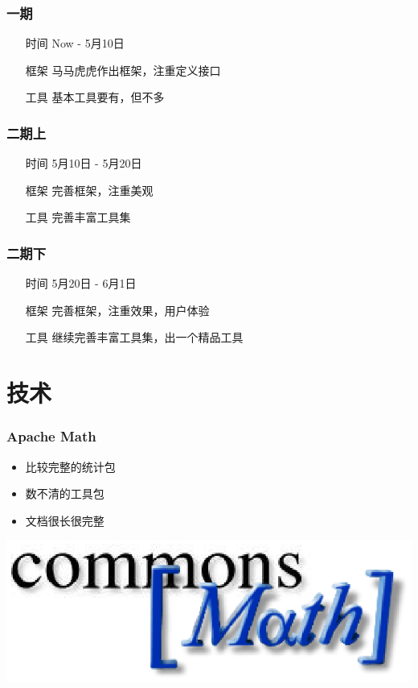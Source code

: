 \documentclass[dvipdfm,serif,mathserif]{beamer}
\begin{document}
\begin{frame}
  \frametitle{一期}
\begin{itemize}
 \item[时间] Now -  5月10日
 \item[框架] 马马虎虎作出框架，注重定义接口
 \item[工具] 基本工具要有，但不多
\end{itemize}
\end{frame}

\begin{frame}
  \frametitle{二期上}
\begin{itemize}
 \item[时间] 5月10日 - 5月20日
 \item[框架] 完善框架，注重美观
 \item[工具] 完善丰富工具集
\end{itemize}
\end{frame}

\begin{frame}
  \frametitle{二期下}
\begin{itemize}
 \item[时间] 5月20日 - 6月1日
 \item[框架] 完善框架，注重效果，用户体验
 \item[工具] 继续完善丰富工具集，出一个精品工具
\end{itemize}
\end{frame}

\section{技术}

\begin{frame}
  \frametitle{Apache Math}
\begin{minipage}[c]{0.6\textwidth}
\begin{itemize}
 \item 比较完整的统计包
 \item 数不清的工具包
 \item 文档很长很完整
\end{itemize}
  \end{minipage}
  \begin{minipage}[c]{0.3\textwidth}
  \includegraphics[width=\textwidth]{math.ps}
  \end{minipage}
 \end{frame}
\end{document}
